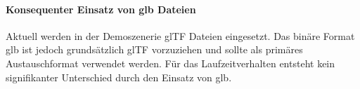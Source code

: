 \paragraph{Konsequenter Einsatz von glb Dateien}
Aktuell werden in der Demoszenerie glTF Dateien eingesetzt. Das binäre Format glb ist jedoch grundsätzlich glTF vorzuziehen und sollte als primäres Austauschformat verwendet werden. Für das Laufzeitverhalten entsteht kein signifikanter Unterschied durch den Einsatz von glb.
